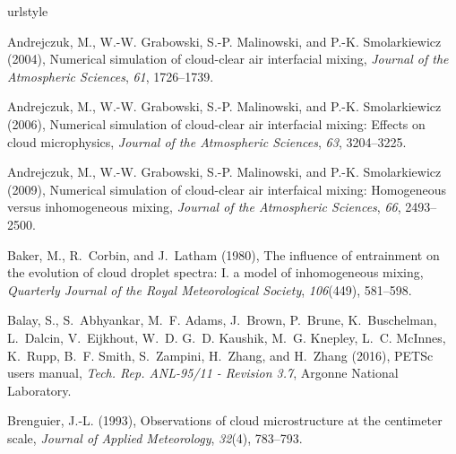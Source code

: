 \documentclass[draft,linenumbers]{agujournal}
\begin{document}
%
%
\begin{thebibliography}{60}
\providecommand{\natexlab}[1]{#1}
\expandafter\ifx\csname urlstyle\endcsname\relax
  \providecommand{\doi}[1]{doi:\discretionary{}{}{}#1}\else
  \providecommand{\doi}{doi:\discretionary{}{}{}\begingroup
  \urlstyle{rm}\Url}\fi

Andrejczuk, M., W.-W. Grabowski, S.-P. Malinowski, and P.-K. Smolarkiewicz
  (2004), Numerical simulation of cloud-clear air interfacial mixing,
  \textit{Journal of the Atmospheric Sciences}, \textit{61}, 1726--1739.

Andrejczuk, M., W.-W. Grabowski, S.-P. Malinowski, and P.-K. Smolarkiewicz
  (2006), Numerical simulation of cloud-clear air interfacial mixing: Effects
  on cloud microphysics, \textit{Journal of the Atmospheric Sciences},
  \textit{63}, 3204--3225.

Andrejczuk, M., W.-W. Grabowski, S.-P. Malinowski, and P.-K. Smolarkiewicz
  (2009), Numerical simulation of cloud-clear air interfaical mixing:
  Homogeneous versus inhomogeneous mixing, \textit{Journal of the Atmospheric
  Sciences}, \textit{66}, 2493--2500.

Baker, M., R.~Corbin, and J.~Latham (1980), The influence of entrainment on the
  evolution of cloud droplet spectra: I. a model of inhomogeneous mixing,
  \textit{Quarterly Journal of the Royal Meteorological Society},
  \textit{106}(449), 581--598.

Balay, S., S.~Abhyankar, M.~F. Adams, J.~Brown, P.~Brune, K.~Buschelman,
  L.~Dalcin, V.~Eijkhout, W.~D. G.~D. Kaushik, M.~G. Knepley, L.~C. McInnes,
  K.~Rupp, B.~F. Smith, S.~Zampini, H.~Zhang, and H.~Zhang (2016), {PETS}c
  users manual, \textit{Tech. Rep. ANL-95/11 - Revision 3.7}, Argonne National
  Laboratory.

Brenguier, J.-L. (1993), Observations of cloud microstructure at the centimeter
  scale, \textit{Journal of Applied Meteorology}, \textit{32}(4), 783--793.


\end{thebibliography}
\end{document}
